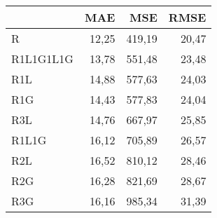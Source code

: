 \begin{tabular}{lrrr}
\toprule
 & MAE & MSE & RMSE \\
\midrule
R & 12,25 & 419,19 & 20,47 \\
R1L1G1L1G & 13,78 & 551,48 & 23,48 \\
R1L & 14,88 & 577,63 & 24,03 \\
R1G & 14,43 & 577,83 & 24,04 \\
R3L & 14,76 & 667,97 & 25,85 \\
R1L1G & 16,12 & 705,89 & 26,57 \\
R2L & 16,52 & 810,12 & 28,46 \\
R2G & 16,28 & 821,69 & 28,67 \\
R3G & 16,16 & 985,34 & 31,39 \\
\bottomrule
\end{tabular}

